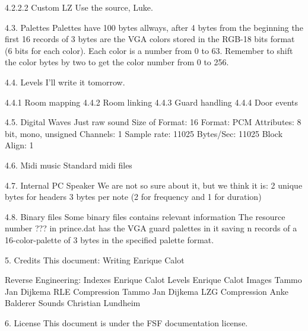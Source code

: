 4.2.2.2 Custom LZ
 Use the source, Luke.
 
4.3. Palettes
 Palettes have 100 bytes allways, after 4 bytes from the beginning the
 first 16 records of 3 bytes are the VGA colors stored in the RGB-18 bits
 format (6 bits for each color). Each color is a number from 0 to 63.
 Remember to shift the color bytes by two to get the color number from 0
 to 256.
 
4.4. Levels
 I'll write it tomorrow.

4.4.1 Room mapping
4.4.2 Room linking
4.4.3 Guard handling
4.4.4 Door events 

4.5. Digital Waves
Just raw sound
 Size of Format: 16
 Format: PCM
 Attributes: 8 bit, mono, unsigned
 Channels: 1
 Sample rate: 11025
 Bytes/Sec: 11025
 Block Align: 1
 
4.6. Midi music
 Standard midi files

4.7. Internal PC Speaker
 We are not so sure about it, but we think it is:
  2 unique bytes for headers
  3 bytes per note (2 for frequency and 1 for duration)
 
4.8. Binary files
 Some binary files contains relevant information
 The resource number ??? in prince.dat has the VGA guard palettes in it
 saving n records of a 16-color-palette of 3 bytes in the specified palette
 format.

5. Credits
 This document:
  Writing                    Enrique Calot

 Reverse Engineering:
  Indexes                    Enrique Calot
  Levels                     Enrique Calot
  Images                 Tammo Jan Dijkema
  RLE Compression        Tammo Jan Dijkema
  LZG Compression            Anke Balderer
  Sounds                Christian Lundheim

6. License
 This document is under the FSF documentation license.
